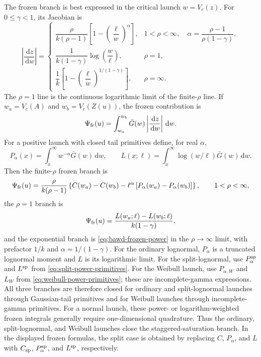 \documentclass[12pt]{article}
\newcommand{\dd}{\,\mathrm{d}}
\newcommand{\Gbar}{\bar{G}}
\theoremstyle{remark}
\begin{document}
The frozen branch is best expressed in the critical launch $w=V_c(z)$. For $0\le\gamma<1$, its Jacobian is
\begin{equation}
 \left|\frac{\dd z}{\dd w}\right|=
 \begin{cases}
 \dfrac{\rho}{k(\rho-1)}
   \left[1-\left(\dfrac{\ell}{w}\right)^\alpha\right],
 &1<\rho<\infty,\quad
   \alpha=\dfrac{\rho-1}{\rho(1-\gamma)},\\[10pt]
 \dfrac{1}{k(1-\gamma)}\log\left(\dfrac{w}{\ell}\right),
 &\rho=1,\\[10pt]
 \dfrac{1}{k}
   \left[1-\left(\dfrac{\ell}{w}\right)^{1/(1-\gamma)}\right],
 &\rho=\infty.
 \end{cases}
 \label{eq:bawd-frozen-jacobian}
\end{equation}
The $\rho=1$ line is the continuous logarithmic limit of the finite-$\rho$ line. If $w_a=V_c(A)$ and $w_b=V_c(Z(u))$, the frozen contribution is
\begin{equation}
 \Psi_{\rm fr}(u)=\int_{w_a}^{w_b}
   \Gbar(w)\left|\frac{\dd z}{\dd w}\right|\dd w.
 \label{eq:bawd-frozen}
\end{equation}
For a positive launch with closed tail primitives define, for real $\alpha$,
\begin{equation}
  P_\alpha(x)=\int_x^\infty w^{-\alpha}\Gbar(w)\dd w,\qquad
  L(x;\ell)=\int_x^\infty \log(w/\ell)\Gbar(w)\dd w.
  \label{eq:bawd-power-primitives}
\end{equation}
Then the finite-$\rho$ frozen branch is
\begin{equation}
 \Psi_{\rm fr}(u)
 =\frac{\rho}{k(\rho-1)}
 \left\{C(w_a)-C(w_b)
 -\ell^\alpha\left[P_\alpha(w_a)-P_\alpha(w_b)\right]\right\},
 \qquad 1<\rho<\infty,
 \label{eq:bawd-frozen-power}
\end{equation}
the $\rho=1$ branch is
\begin{equation}
 \Psi_{\rm fr}(u)
 =\frac{L(w_a;\ell)-L(w_b;\ell)}{k(1-\gamma)},
 \label{eq:bawd-frozen-log}
\end{equation}
and the exponential branch is \eqref{eq:bawd-frozen-power} in the $\rho\to\infty$ limit, with prefactor $1/k$ and $\alpha=1/(1-\gamma)$. For the ordinary lognormal, $P_\alpha$ is a truncated lognormal moment and $L$ is its logarithmic limit. For the split-lognormal, use $P_\alpha^{\rm sp}$ and $L^{\rm sp}$ from
\eqref{eq:split-power-primitives}. For the Weibull launch, use
$P_{\alpha,W}$ and $L_W$ from \eqref{eq:weibull-power-primitives}; these are incomplete-gamma expressions. All three branches are therefore closed for ordinary and split-lognormal launches through Gaussian-tail primitives and for Weibull launches through incomplete-gamma primitives. For a normal launch, these power- or logarithm-weighted frozen integrals generally require one-dimensional quadrature. Thus the ordinary, split-lognormal, and Weibull launches close the staggered-saturation branch. In the displayed frozen formulas, the split case is obtained by replacing $C$, $P_\alpha$, and $L$ with $C_{\rm sp}$, $P_\alpha^{\rm sp}$, and $L^{\rm sp}$, respectively.
\end{document}
